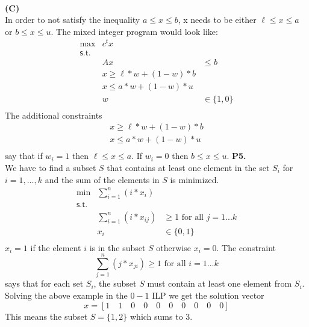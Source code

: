 \documentclass[11pt]{article}
\begin{document}
\\
\noindent\textbf{(C)}
\\
In order to not satisfy the inequality $a \leq x \leq b$, x needs to be either $\ell \leq x \leq a$ or $b \leq x \leq u$.  The mixed integer program would look like:
\[\begin{array}{rlllllllll}
\max & c^{t}x \\
\mathsf{s.t. } \\
& Ax & \leq b \\
& x \geq \ell*w+(1-w)*b \\
& x \leq a*w+(1-w)*u \\
& w & \in \{1,0\} \\
\end{array}\]
The additional constraints
\begin{align*}
x \geq \ell*w+(1-w)*b \\
x \leq a*w+(1-w)*u \\
\end{align*}
say that if $w_i = 1$ then $\ell \leq x \leq a$.  If $w_i = 0$ then $b \leq x \leq u$.
\newpage
\noindent\textbf{P5.}
\\
We have to find a subset $S$ that contains at least one element in the set $S_i$ for $i = 1,\ldots, k$ and the sum of the elements in $S$ is minimized.
\[\begin{array}{rlllllllll}
\min & \sum_{i=1}^{n} (i*x_i) \\
\mathsf{s.t. } \\
& \sum_{i=1}^{n} (i*x_{ij}) & \geq 1 \text{ for all }j = 1...k\\
& x_i & \in \{0,1\} \\
\end{array}\]
$x_i = 1$ if the element $i$ is in the subset $S$ otherwise $x_i = 0$.  The constraint 
$$
\sum_{j=1}^{n} (j*x_{ji}) \geq 1 \text{ for all }i = 1...k
$$
says that for each set $S_i$, the subset $S$ must contain at least one element from $S_i$.  Solving the above example in the $0-1$ ILP we get the solution vector 
$$
x = [1\quad1\quad0\quad0\quad0\quad0\quad0\quad0\quad0\quad0]
$$ 
This means the subset $S = \{1, 2\}$ which sums to 3.





\end{document}

